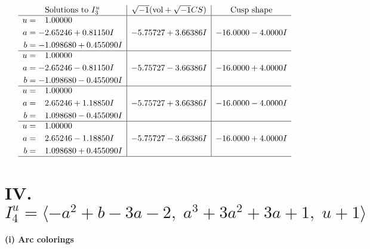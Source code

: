 \documentclass[1p]{elsarticle_modified}
\theoremstyle{definition}
\newcommand{\I}{\sqrt{-1}}
\begin{document}
$$\begin{array}{c|c|c}  
\text{Solutions to }I^u_{3}& \I (\text{vol} + \sqrt{-1}CS) & \text{Cusp shape}\\
 \hline 
\begin{aligned}
u &= \phantom{-}1.00000\phantom{ +0.000000I} \\
a &= -2.65246 + 0.81150 I \\
b &= -1.098680 + 0.455090 I\end{aligned}
 & -5.75727 + 3.66386 I & -16.0000 - 4.0000 I \\ \hline\begin{aligned}
u &= \phantom{-}1.00000\phantom{ +0.000000I} \\
a &= -2.65246 - 0.81150 I \\
b &= -1.098680 - 0.455090 I\end{aligned}
 & -5.75727 - 3.66386 I & -16.0000 + 4.0000 I \\ \hline\begin{aligned}
u &= \phantom{-}1.00000\phantom{ +0.000000I} \\
a &= \phantom{-}2.65246 + 1.18850 I \\
b &= \phantom{-}1.098680 - 0.455090 I\end{aligned}
 & -5.75727 + 3.66386 I & -16.0000 - 4.0000 I \\ \hline\begin{aligned}
u &= \phantom{-}1.00000\phantom{ +0.000000I} \\
a &= \phantom{-}2.65246 - 1.18850 I \\
b &= \phantom{-}1.098680 + 0.455090 I\end{aligned}
 & -5.75727 - 3.66386 I & -16.0000 + 4.0000 I\\
 \hline 
 \end{array}$$\newpage\newpage\renewcommand{\arraystretch}{1}
\centering \section*{IV. $I^u_{4}= \langle - a^2+b-3 a-2,\;a^3+3 a^2+3 a+1,\;u+1 \rangle$}
\flushleft \textbf{(i) Arc colorings}\\
\end{document}
